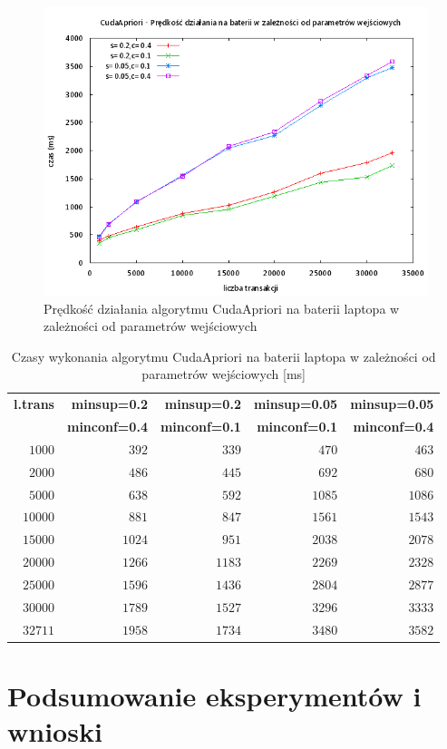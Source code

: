 \begin{figure}[H]
\centering
\includegraphics[width=1.1\textwidth]{figures/06/capriori_bat.png}
\caption{Prędkość działania algorytmu CudaApriori na baterii laptopa w zależności od parametrów wejściowych\label{rys:capriori_bat}}
\end{figure}

\begin{table}
	\centering
	\begin{tabular}{r|r|r|r|r}
	\textbf{l.trans} & \textbf{minsup=0.2} & \textbf{minsup=0.2} & \textbf{minsup=0.05} & \textbf{minsup=0.05}  \\
	 & \textbf{minconf=0.4} & \textbf{minconf=0.1} & \textbf{minconf=0.1} & \textbf{minconf=0.4}  \\ \hline
	$1000$ & $392$ & $339$ & $470$ & $463$ \\
	$2000$ & $486$ & $445$ & $692$ & $680$ \\
	$5000$ & $638$ & $592$ & $1085$ & $1086$ \\
	$10000$ & $881$ & $847$ & $1561$ & $1543$ \\
	$15000$ & $1024$ & $951$ & $2038$ & $2078$ \\
	$20000$ & $1266$ & $1183$ & $2269$ & $2328$ \\
	$25000$ & $1596$ & $1436$ & $2804$ & $2877$ \\
	$30000$ & $1789$ & $1527$ & $3296$ & $3333$ \\
	$32711$ & $1958$ & $1734$ & $3480$ & $3582$ \\
	\end{tabular}
	\caption{Czasy wykonania algorytmu CudaApriori na baterii laptopa w zależności od parametrów wejściowych [ms]\label{tab:capriori_bat}}
\end{table}
\section{Podsumowanie eksperymentów i wnioski}